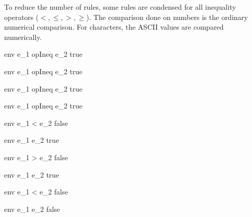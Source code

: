 \documentclass{article}
\begin{document}
To reduce the number of rules, some rules are condensed for all inequality operators ($<, \leq, >, \geq$).
The comparison done on numbers is the ordinary numerical comparison.
For characters, the ASCII values are compared numerically.

    {\mbox{env} \vdash e_1 \; opIneq \; e_2 \Downarrow true}

    {\mbox{env} \vdash e_1 \; opIneq \; e_2 \Downarrow true}

\medskip

    {\mbox{env} \vdash e_1 \; opIneq \; e_2 \Downarrow true}

    {\mbox{env} \vdash e_1 \; opIneq \; e_2 \Downarrow true}

\medskip

    {\mbox{env} \vdash e_1 < e_2 \Downarrow false}

    {\mbox{env} \vdash e_1 \leq e_2 \Downarrow true}

    {\mbox{env} \vdash e_1 > e_2 \Downarrow false}

    {\mbox{env} \vdash e_1 \geq e_2 \Downarrow true}

\medskip

    {\mbox{env} \vdash e_1 < e_2 \Downarrow false}

    {\mbox{env} \vdash e_1 \leq e_2 \Downarrow false}
\end{document}
